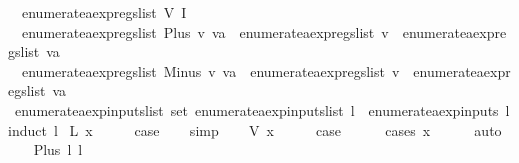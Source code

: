 \begin{isabellebody}
\ \ {\isachardoublequoteopen}enumerate{\isacharunderscore}aexp{\isacharunderscore}regs{\isacharunderscore}list\ {\isacharparenleft}V\ {\isacharparenleft}I\ {\isacharunderscore}{\isacharparenright}{\isacharparenright}\ {\isacharequal}\ {\isacharbrackleft}{\isacharbrackright}{\isachardoublequoteclose}\ {\isacharbar}\isanewline
\ \ {\isachardoublequoteopen}enumerate{\isacharunderscore}aexp{\isacharunderscore}regs{\isacharunderscore}list\ {\isacharparenleft}Plus\ v\ va{\isacharparenright}\ {\isacharequal}\ enumerate{\isacharunderscore}aexp{\isacharunderscore}regs{\isacharunderscore}list\ v\ {\isacharat}\ enumerate{\isacharunderscore}aexp{\isacharunderscore}regs{\isacharunderscore}list\ va{\isachardoublequoteclose}\ {\isacharbar}\isanewline
\ \ {\isachardoublequoteopen}enumerate{\isacharunderscore}aexp{\isacharunderscore}regs{\isacharunderscore}list\ {\isacharparenleft}Minus\ v\ va{\isacharparenright}\ {\isacharequal}\ enumerate{\isacharunderscore}aexp{\isacharunderscore}regs{\isacharunderscore}list\ v\ {\isacharat}\ enumerate{\isacharunderscore}aexp{\isacharunderscore}regs{\isacharunderscore}list\ va{\isachardoublequoteclose}\isanewline
\isanewline
{}\isamarkupfalse%
\ enumerate{\isacharunderscore}aexp{\isacharunderscore}inputs{\isacharunderscore}list{\isacharcolon}\ {\isachardoublequoteopen}set\ {\isacharparenleft}enumerate{\isacharunderscore}aexp{\isacharunderscore}inputs{\isacharunderscore}list\ l{\isacharparenright}\ {\isacharequal}\ enumerate{\isacharunderscore}aexp{\isacharunderscore}inputs\ l{\isachardoublequoteclose}\isanewline
%
\isadelimproof
%
\endisadelimproof
%
\isatagproof
{}\isamarkupfalse%
{\isacharparenleft}induct\ l{\isacharparenright}\isanewline
{}\isamarkupfalse%
\ {\isacharparenleft}L\ x{\isacharparenright}\isanewline
\ \ \isamarkupfalse%
\ \isamarkupfalse%
\ {\isacharquery}case\isanewline
\ \ \isamarkupfalse%
\ simp\isanewline
{}\isamarkupfalse%
\isanewline
\ \ \isamarkupfalse%
\ {\isacharparenleft}V\ x{\isacharparenright}\isanewline
\ \ \isamarkupfalse%
\ \isamarkupfalse%
\ {\isacharquery}case\isanewline
\ \ \ \ \isamarkupfalse%
\ {\isacharparenleft}cases\ x{\isacharparenright}\isanewline
\ \ \ \ \isamarkupfalse%
\ auto\isanewline
{}\isamarkupfalse%
\isanewline
\ \ \isamarkupfalse%
\ {\isacharparenleft}Plus\ l{}\ l{}{\isacharparenright}\isanewline
\ \ \isamarkupfalse%
\ \isamarkupfalse%

\end{isabellebody}
